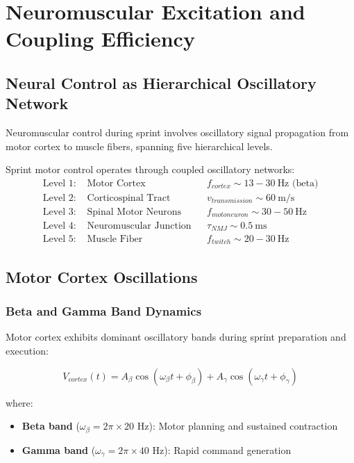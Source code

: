 \section{Neuromuscular Excitation and Coupling Efficiency}

\subsection{Neural Control as Hierarchical Oscillatory Network}

Neuromuscular control during sprint involves oscillatory signal propagation from motor cortex to muscle fibers, spanning five hierarchical levels.

\begin{definition}
Sprint motor control operates through coupled oscillatory networks:
\begin{align}
\text{Level 1: } &\text{Motor Cortex} && f_{cortex} \sim 13-30~\text{Hz (beta)} \\
\text{Level 2: } &\text{Corticospinal Tract} && v_{transmission} \sim 60~\text{m/s} \\
\text{Level 3: } &\text{Spinal Motor Neurons} && f_{motoneuron} \sim 30-50~\text{Hz} \\
\text{Level 4: } &\text{Neuromuscular Junction} && \tau_{NMJ} \sim 0.5~\text{ms} \\
\text{Level 5: } &\text{Muscle Fiber} && f_{twitch} \sim 20-30~\text{Hz}
\end{align}
\end{definition}

\subsection{Motor Cortex Oscillations}

\subsubsection{Beta and Gamma Band Dynamics}

Motor cortex exhibits dominant oscillatory bands during sprint preparation and execution:

\begin{equation}
V_{cortex}(t) = A_{\beta} \cos(\omega_{\beta} t + \phi_{\beta}) + A_{\gamma} \cos(\omega_{\gamma} t + \phi_{\gamma})
\label{eq:cortical_oscillations}
\end{equation}

where:
\begin{itemize}
\item \textbf{Beta band} ($\omega_{\beta} = 2\pi \times 20$ Hz): Motor planning and sustained contraction
\item \textbf{Gamma band} ($\omega_{\gamma} = 2\pi \times 40$ Hz): Rapid command generation
\end{itemize}

